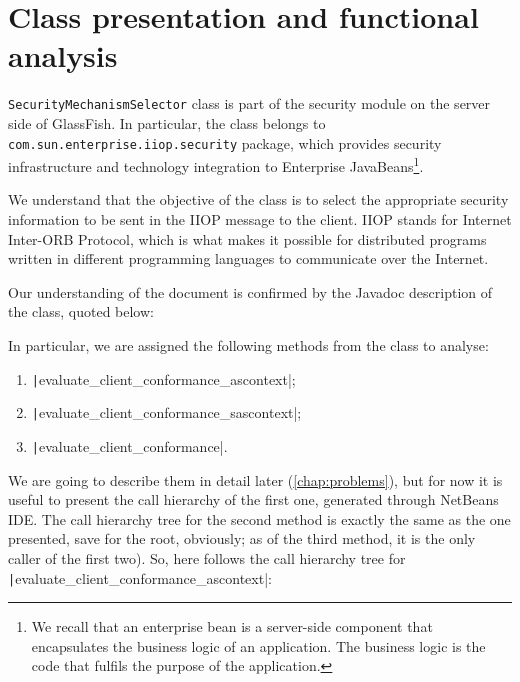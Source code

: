 \chapter{Class presentation and functional analysis}\label{chap:class}




\verb|SecurityMechanismSelector| class is part of the security module on the server side of GlassFish. In particular, the class belongs to \verb|com.sun.enterprise.iiop.security| package, which provides security infrastructure and technology integration to Enterprise JavaBeans\footnote{We recall that an enterprise bean is a \mbox{server-side} component that encapsulates the business logic of an application. The business logic is the code that fulfils the purpose of the application.}. 

We understand that the objective of the class is to select the appropriate security information to be sent in the IIOP message to the client. IIOP stands for Internet \mbox{Inter-ORB} Protocol, which is what makes it possible for distributed programs written in different programming languages to communicate over the Internet. 

Our understanding of the document is confirmed by the Javadoc description of the class, quoted below:


In particular, we are assigned the following methods from the class to analyse:

\begin{enumerate}
	\item \texttt|evaluate_client_conformance_ascontext|;
	\item \texttt|evaluate_client_conformance_sascontext|;
	\item \texttt|evaluate_client_conformance|.
\end{enumerate}

We are going to describe them in detail later (\cref{chap:problems}), but for now it is useful to present the call hierarchy of the first one, generated through NetBeans IDE. The call hierarchy tree for the second method is exactly the same as the one presented, save for the root, obviously; as of the third method, it is the only caller of the first two). So, here follows the call hierarchy tree for \texttt|evaluate_client_conformance_ascontext|:

